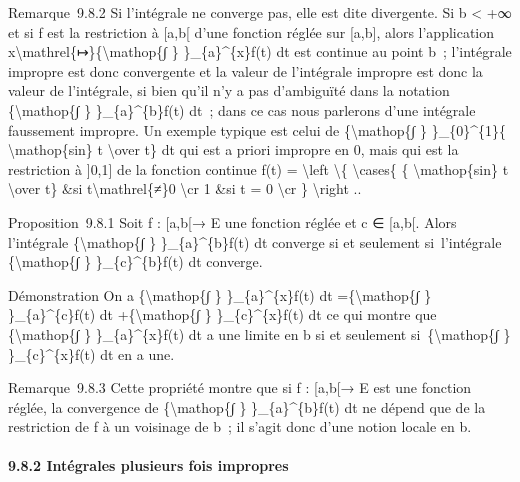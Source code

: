 \documentclass[]{article}
\begin{document}
Remarque~9.8.2 Si l'intégrale ne converge pas, elle est dite divergente.
Si b \textless{} +∞ et si f est la restriction à {[}a,b{[} d'une
fonction réglée sur {[}a,b{]}, alors l'application
x\textbackslash{}mathrel\{↦\}\{\textbackslash{}mathop\{∫ \}
\}\_\{a\}\^{}\{x\}f(t) dt est continue au point b~; l'intégrale impropre
est donc convergente et la valeur de l'intégrale impropre est donc la
valeur de l'intégrale, si bien qu'il n'y a pas d'ambiguïté dans la
notation \{\textbackslash{}mathop\{∫ \} \}\_\{a\}\^{}\{b\}f(t) dt~; dans
ce cas nous parlerons d'une intégrale faussement impropre. Un exemple
typique est celui de \{\textbackslash{}mathop\{∫ \} \}\_\{0\}\^{}\{1\}\{
\textbackslash{}mathop\{sin\} t \textbackslash{}over t\} dt qui est a
priori impropre en 0, mais qui est la restriction à {]}0,1{]} de la
fonction continue f(t) = \textbackslash{}left \textbackslash{}\{
\textbackslash{}cases\{ \{ \textbackslash{}mathop\{sin\} t
\textbackslash{}over t\} \&si t\textbackslash{}mathrel\{≠\}0
\textbackslash{}cr 1 \&si t = 0 \textbackslash{}cr \}
\textbackslash{}right ..

Proposition~9.8.1 Soit f : {[}a,b{[}→ E une fonction réglée et c ∈
{[}a,b{[}. Alors l'intégrale \{\textbackslash{}mathop\{∫ \}
\}\_\{a\}\^{}\{b\}f(t) dt converge si et seulement si~l'intégrale
\{\textbackslash{}mathop\{∫ \} \}\_\{c\}\^{}\{b\}f(t) dt converge.

Démonstration On a \{\textbackslash{}mathop\{∫ \} \}\_\{a\}\^{}\{x\}f(t)
dt =\{\textbackslash{}mathop\{∫ \} \}\_\{a\}\^{}\{c\}f(t) dt
+\{\textbackslash{}mathop\{∫ \} \}\_\{c\}\^{}\{x\}f(t) dt ce qui montre
que \{\textbackslash{}mathop\{∫ \} \}\_\{a\}\^{}\{x\}f(t) dt a une
limite en b si et seulement si~\{\textbackslash{}mathop\{∫ \}
\}\_\{c\}\^{}\{x\}f(t) dt en a une.

Remarque~9.8.3 Cette propriété montre que si f : {[}a,b{[}→ E est une
fonction réglée, la convergence de \{\textbackslash{}mathop\{∫ \}
\}\_\{a\}\^{}\{b\}f(t) dt ne dépend que de la restriction de f à un
voisinage de b~; il s'agit donc d'une notion locale en b.

\paragraph{9.8.2 Intégrales plusieurs fois impropres}
\end{document}
